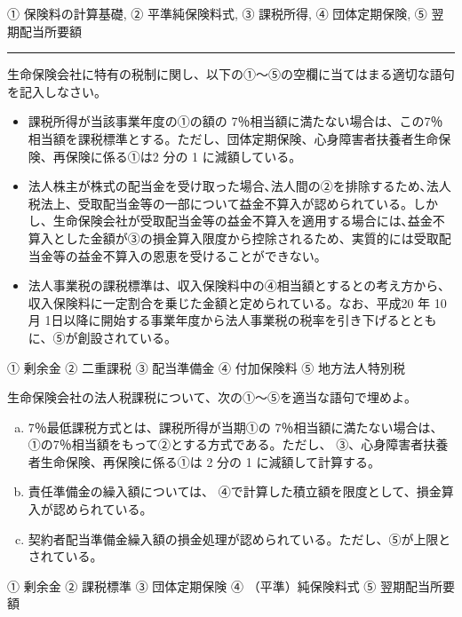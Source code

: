 \documentclass[report,gutter=10mm,fore-edge=10mm,uplatex,dvipdfmx]{jlreq}
\begin{document}

① 保険料の計算基礎, ② 平準純保険料式, ③ 課税所得, ④ 団体定期保険, ⑤
翌期配当所要額

\begin{center}\rule{0.5\linewidth}{0.5pt}\end{center}


生命保険会社に特有の税制に関し、以下の①～⑤の空欄に当てはまる適切な語句を記入しなさい。
\begin{itemize}
 \item 課税所得が当該事業年度の①の額の 7％相当額に満たない場合は、この7％相当額を課税標準とする。ただし、団体定期保険、心身障害者扶養者生命保険、再保険に係る①は2 分の 1 に減額している。
 \item 法人株主が株式の配当金を受け取った場合､法人間の②を排除するため､法人税法上、受取配当金等の一部について益金不算入が認められている。しかし、生命保険会社が受取配当金等の益金不算入を適用する場合には､益金不算入とした金額が③の損金算入限度から控除されるため、実質的には受取配当金等の益金不算入の恩恵を受けることができない。
 \item 法人事業税の課税標準は、収入保険料中の④相当額とするとの考え方から､収入保険料に一定割合を乗じた金額と定められている。なお、平成20 年 10 月 1日以降に開始する事業年度から法人事業税の税率を引き下げるとともに、⑤が創設されている。
\end{itemize}


① 剰余金  ② 二重課税 ③ 配当準備金 ④ 付加保険料 ⑤ 地方法人特別税



生命保険会社の法人税課税について、次の①～⑤を適当な語句で埋めよ。
\begin{enumerate} [(a) ]
\item 7％最低課税方式とは、課税所得が当期①の
 7％相当額に満たない場合は、①の7％相当額をもって②とする方式である。ただし、
 ③、心身障害者扶養者生命保険、再保険に係る①は 2 分の 1
 に減額して計算する。 
\item 責任準備金の繰入額については、
 ④で計算した積立額を限度として、損金算入が認められている。
 \item 
契約者配当準備金繰入額の損金処理が認められている。ただし、⑤が上限とされている。
\end{enumerate}


①  剰余金 ②   課税標準 ③   団体定期保険  ④ （平準）純保険料式  ⑤   翌期配当所要額
\end{document}
